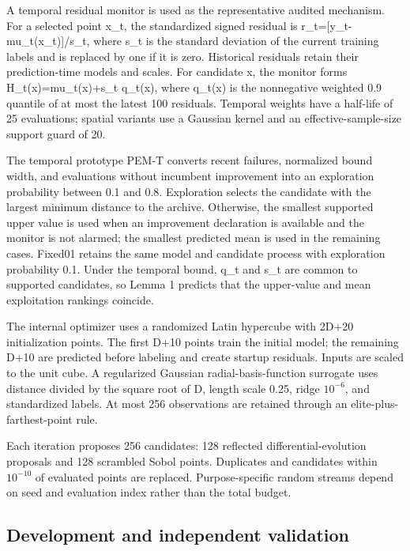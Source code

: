 \documentclass[cmc,article,submit,moreauthors,pdftex]{Definitions/tsp}
\begin{document}
A temporal residual monitor is used as the representative audited mechanism. For a selected point x\_t, the standardized signed residual is r\_t={[}y\_t-mu\_t(x\_t){]}/s\_t, where s\_t is the standard deviation of the current training labels and is replaced by one if it is zero. Historical residuals retain their prediction-time models and scales. For candidate x, the monitor forms H\_t(x)=mu\_t(x)+s\_t q\_t(x), where q\_t(x) is the nonnegative weighted 0.9 quantile of at most the latest 100 residuals. Temporal weights have a half-life of 25 evaluations; spatial variants use a Gaussian kernel and an effective-sample-size support guard of 20.

The temporal prototype PEM-T converts recent failures, normalized bound width, and evaluations without incumbent improvement into an exploration probability between 0.1 and 0.8. Exploration selects the candidate with the largest minimum distance to the archive. Otherwise, the smallest supported upper value is used when an improvement declaration is available and the monitor is not alarmed; the smallest predicted mean is used in the remaining cases. Fixed01 retains the same model and candidate process with exploration probability 0.1. Under the temporal bound, q\_t and s\_t are common to supported candidates, so Lemma 1 predicts that the upper-value and mean exploitation rankings coincide.

The internal optimizer uses a randomized Latin hypercube with 2D+20 initialization points. The first D+10 points train the initial model; the remaining D+10 are predicted before labeling and create startup residuals. Inputs are scaled to the unit cube. A regularized Gaussian radial-basis-function surrogate uses distance divided by the square root of D, length scale 0.25, ridge $10^{-6}$, and standardized labels. At most 256 observations are retained through an elite-plus-farthest-point rule.

Each iteration proposes 256 candidates: 128 reflected differential-evolution proposals and 128 scrambled Sobol points. Duplicates and candidates within $10^{-10}$ of evaluated points are replaced. Purpose-specific random streams depend on seed and evaluation index rather than the total budget.

\hypertarget{development-and-independent-validation}{%
\subsection{Development and independent validation}\label{development-and-independent-validation}}
\end{document}
